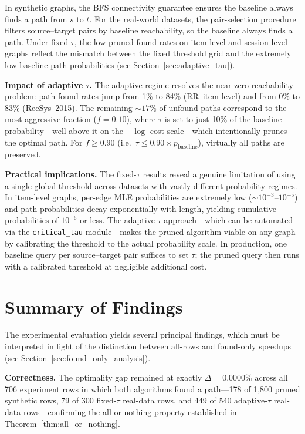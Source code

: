 In synthetic graphs, the BFS connectivity guarantee ensures the baseline always finds a path from $s$ to $t$. For the real-world datasets, the pair-selection procedure filters source--target pairs by baseline reachability, so the baseline always finds a path. Under fixed $\tau$, the low pruned-found rates on item-level and session-level graphs reflect the mismatch between the fixed threshold grid and the extremely low baseline path probabilities (see Section~\ref{sec:adaptive_tau}).

\textbf{Impact of adaptive $\tau$.} The adaptive regime resolves the near-zero reachability problem: path-found rates jump from 1\% to 84\% (RR~item-level) and from 0\% to 83\% (RecSys~2015). The remaining ${\sim}17\%$ of unfound paths correspond to the most aggressive fraction ($f=0.10$), where $\tau$ is set to just 10\% of the baseline probability---well above it on the $-\log$ cost scale---which intentionally prunes the optimal path. For $f \geq 0.90$ (i.e.\ $\tau \leq 0.90 \times p_{\text{baseline}}$), virtually all paths are preserved.

\textbf{Practical implications.} The fixed-$\tau$ results reveal a genuine limitation of using a single global threshold across datasets with vastly different probability regimes. In item-level graphs, per-edge MLE probabilities are extremely low ($\sim10^{-3}$--$10^{-5}$) and path probabilities decay exponentially with length, yielding cumulative probabilities of $10^{-6}$ or less. The adaptive $\tau$ approach---which can be automated via the \texttt{critical\_tau} module---makes the pruned algorithm viable on any graph by calibrating the threshold to the actual probability scale. In production, one baseline query per source--target pair suffices to set $\tau$; the pruned query then runs with a calibrated threshold at negligible additional cost.

\section{Summary of Findings}

The experimental evaluation yields several principal findings, which must be interpreted in light of the distinction between all-rows and found-only speedups (see Section~\ref{sec:found_only_analysis}).

\textbf{Correctness.} The optimality gap remained at exactly $\Delta = 0.0000\%$ across all 706 experiment rows in which both algorithms found a path---178 of 1,800 pruned synthetic rows, 79 of 300 fixed-$\tau$ real-data rows, and 449 of 540 adaptive-$\tau$ real-data rows---confirming the all-or-nothing property established in Theorem~\ref{thm:all_or_nothing}.

